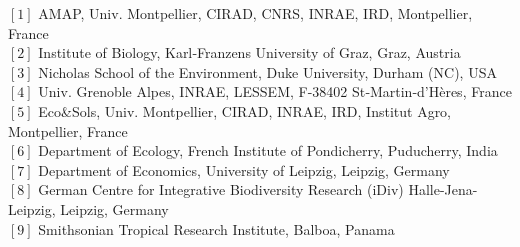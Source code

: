 {\small
  \begin{flushleft}
    $[1]$ AMAP, Univ. Montpellier, CIRAD, CNRS, INRAE, IRD, Montpellier, France\\
    $[2]$ Institute of Biology, Karl‐Franzens University of Graz, Graz, Austria\\
    $[3]$ Nicholas School of the Environment, Duke University, Durham (NC), USA\\
    $[4]$ Univ. Grenoble Alpes, INRAE, LESSEM, F-38402 St‐Martin‐d'Hères, France\\
    $[5]$ Eco\&Sols, Univ. Montpellier, CIRAD, INRAE, IRD, Institut Agro, Montpellier, France\\
    $[6]$ Department of Ecology, French Institute of Pondicherry, Puducherry, India\\
    $[7]$ Department of Economics, University of Leipzig, Leipzig, Germany\\
    $[8]$ German Centre for Integrative Biodiversity Research (iDiv) Halle-Jena-Leipzig, Leipzig, Germany\\
    $[9]$ Smithsonian Tropical Research Institute, Balboa, Panama\\
  \end{flushleft}}

\vspace{1cm}